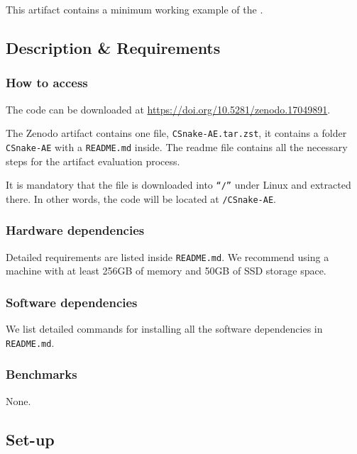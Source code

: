 This artifact contains a minimum working example of the \tool. 

\subsection{Description \& Requirements}

\subsubsection{How to access}

The code can be downloaded at \url{https://doi.org/10.5281/zenodo.17049891}.

The Zenodo artifact contains one file, \texttt{CSnake-AE.tar.zst}, it contains a folder \texttt{CSnake-AE} with a \texttt{README.md} inside. The readme file contains all the necessary steps for the artifact evaluation process.

It is mandatory that the file is downloaded into \texttt{``/''} under Linux and extracted there. In other words, the code will be located at \texttt{/CSnake-AE}.

\subsubsection{Hardware dependencies}

Detailed requirements are listed inside \texttt{README.md}. We recommend using a machine with at least 256GB of memory and 50GB of SSD storage space. 

\subsubsection{Software dependencies}

We list detailed commands for installing all the software dependencies in \texttt{README.md}.

\subsubsection{Benchmarks} 

None.

\subsection{Set-up}

